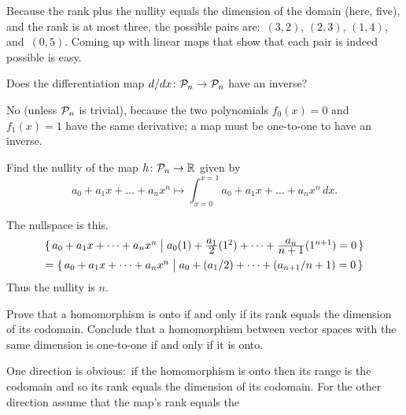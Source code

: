 \begin{exercises}
\begin{answer}
      Because the rank plus the nullity equals the dimension of the domain 
      (here, five), and the rank is at most three,
      the possible pairs are:~\( (3,2) \), \( (2,3) \), 
      \( (1,4) \), and~\( (0,5) \).
      Coming up with linear maps that show that each pair is indeed
      possible is easy.  
    \end{answer}
  \item 
    Does the differentiation map
    \( \mbox{$d/dx\colon \mathcal{P}_n\to \mathcal{P}_n$} \) have an inverse?
    \begin{answer}
      No (unless \( \mathcal{P}_n \) is trivial), because the two polynomials
      \( f_0(x)=0 \) and \( f_1(x)=1 \) have the same derivative; a map must be
      one-to-one to have an inverse.
    \end{answer}
  \recommended \item
    Find the nullity of the map \( \mbox{$h\colon \mathcal{P}_n\to \mathbb{R}$} \) given by
    \begin{equation*}
      a_0+a_1x+\dots+a_nx^n\mapsto\int_{x=0}^{x=1}a_0+a_1x+\dots+a_nx^n\,dx.
    \end{equation*}
    \begin{answer}
      The nullspace is this.
      \begin{multline*}
        \mbox{$\{\,a_0+a_1x+\dots+a_nx^n\bigm|
                   a_0(1)+\frac{\displaystyle a_1}{\displaystyle 2}(1^2)
                   +\dots
                   +\frac{\displaystyle a_n}{\displaystyle n+1}(1^{n+1})=0\,\}$} \\
        =\mbox{$\{\,a_0+a_1x+\dots+a_nx^n\bigm|
                   a_0+(a_1/2)+\dots+(a_{n+1}/n+1)=0\,\}$}
      \end{multline*}
      Thus the nullity is \( n \).  
     \end{answer}
  \item 
    \begin{exparts}
      \partsitem Prove that a homomorphism is onto if and only if its
        rank equals the dimension of its codomain.
      \partsitem Conclude that a homomorphism between vector spaces with 
        the same dimension is one-to-one if and only if it is onto.
    \end{exparts}
    \begin{answer}
      \begin{exparts}
        \partsitem One direction is obvious:~if the homomorphism 
          is onto then its range is the codomain and so its
          rank equals the dimension of its codomain.
          For the other direction assume that the map's rank equals the

\end{exparts}
\end{answer}
\end{exercises}
